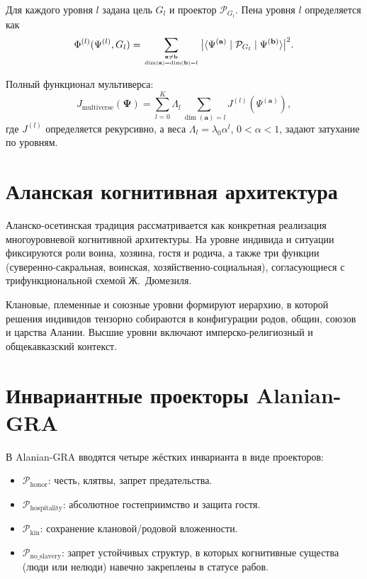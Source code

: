 \documentclass[11pt,a4paper]{article}
\begin{document}
Для каждого уровня \(l\) задана цель \(G_l\) и проектор \(\mathcal{P}_{G_l}\).
Пена уровня \(l\) определяется как
\[
\Phi^{(l)}(\Psi^{(l)}, G_l) =
\sum_{\mathbf{a}\neq \mathbf{b} \atop \dim(\mathbf{a})=\dim(\mathbf{b})=l}
\big|\langle \Psi^{(\mathbf{a})} \mid \mathcal{P}_{G_l} \mid \Psi^{(\mathbf{b})} \rangle\big|^2.
\]

Полный функционал мультиверса:
\[
J_{\text{multiverse}}(\mathbf{\Psi}) =
\sum_{l=0}^{K} \Lambda_l
\sum_{\dim(\mathbf{a})=l} J^{(l)}(\Psi^{(\mathbf{a})}),
\]
где \(J^{(l)}\) определяется рекурсивно, а веса \(\Lambda_l = \lambda_0 \alpha^l\),
\(0<\alpha<1\), задают затухание по уровням.

\section{Аланская когнитивная архитектура}

Аланско-осетинская традиция рассматривается как конкретная реализация
многоуровневой когнитивной архитектуры. На уровне индивида и ситуации
фиксируются роли воина, хозяина, гостя и родича, а также три функции
(суверенно-сакральная, воинская, хозяйственно-социальная), согласующиеся
с трифункциональной схемой Ж.~Дюмезиля.

Клановые, племенные и союзные уровни формируют иерархию, в которой решения
индивидов тензорно собираются в конфигурации родов, общин, союзов и царства
Алании. Высшие уровни включают имперско-религиозный и общекавказский контекст.

\section{Инвариантные проекторы Alanian-GRA}

В Alanian-GRA вводятся четыре жёстких инварианта в виде проекторов:

\begin{itemize}
  \item \(\mathcal{P}_{\text{honor}}\): честь, клятвы, запрет предательства.
  \item \(\mathcal{P}_{\text{hospitality}}\): абсолютное гостеприимство и защита гостя.
  \item \(\mathcal{P}_{\text{kin}}\): сохранение клановой/родовой вложенности.
  \item \(\mathcal{P}_{\text{no\_slavery}}\): запрет устойчивых структур, в которых
  когнитивные существа (люди или нелюди) навечно закреплены в статусе рабов.
\end{itemize}
\end{document}
